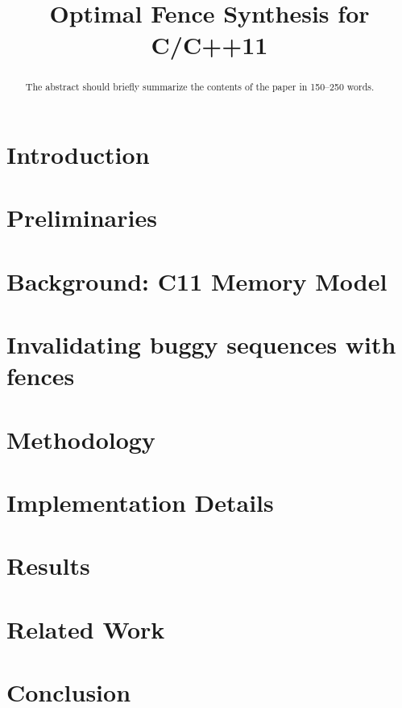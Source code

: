 \documentclass[runningheads]{llncs2e/llncs}
\begin{document}
%
\title{Optimal Fence Synthesis for C/C++11}
%
%
\maketitle              %
%
\begin{abstract}
The abstract should briefly summarize the contents of the paper in
150--250 words.

\end{abstract}
%
%
%
\section{Introduction} \label{sec:intro}

\section{Preliminaries} \label{sec:preliminaries}


\section{Background: C11 Memory Model} \label{sec:c11}


\section{Invalidating buggy sequences with fences} \label{sec:so theory}


\section{Methodology} \label{sec:methodology}


\section{Implementation Details} \label{sec:implementation}


\section{Results} \label{sec:results}


\section{Related Work} \label{sec:related}
%

\section{Conclusion} \label{sec:conclusion}



\end{document}
